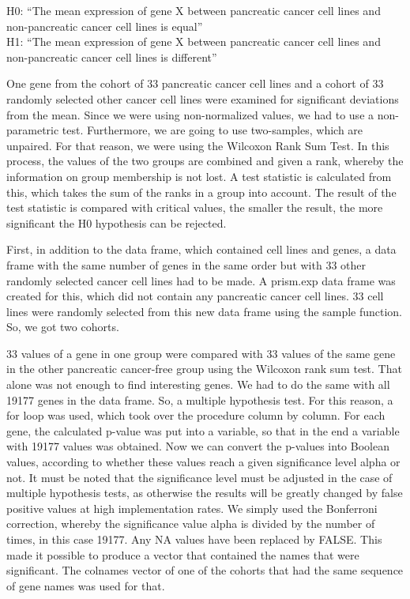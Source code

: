 \documentclass[
]{article}
\begin{document}
H0: ``The mean expression of gene X between pancreatic cancer cell lines
and non-pancreatic cancer cell lines is equal''\\
H1: ``The mean expression of gene X between pancreatic cancer cell lines
and non-pancreatic cancer cell lines is different''

One gene from the cohort of 33 pancreatic cancer cell lines and a cohort
of 33 randomly selected other cancer cell lines were examined for
significant deviations from the mean. Since we were using non-normalized
values, we had to use a non-parametric test. Furthermore, we are going
to use two-samples, which are unpaired. For that reason, we were using
the Wilcoxon Rank Sum Test. In this process, the values of the two
groups are combined and given a rank, whereby the information on group
membership is not lost. A test statistic is calculated from this, which
takes the sum of the ranks in a group into account. The result of the
test statistic is compared with critical values, the smaller the result,
the more significant the H0 hypothesis can be rejected.

First, in addition to the data frame, which contained cell lines and
genes, a data frame with the same number of genes in the same order but
with 33 other randomly selected cancer cell lines had to be made. A
prism.exp data frame was created for this, which did not contain any
pancreatic cancer cell lines. 33 cell lines were randomly selected from
this new data frame using the sample function. So, we got two cohorts.

33 values of a gene in one group were compared with 33 values of the
same gene in the other pancreatic cancer-free group using the Wilcoxon
rank sum test. That alone was not enough to find interesting genes. We
had to do the same with all 19177 genes in the data frame. So, a
multiple hypothesis test. For this reason, a for loop was used, which
took over the procedure column by column. For each gene, the calculated
p-value was put into a variable, so that in the end a variable with
19177 values was obtained. Now we can convert the p-values into Boolean
values, according to whether these values reach a given significance
level alpha or not. It must be noted that the significance level must be
adjusted in the case of multiple hypothesis tests, as otherwise the
results will be greatly changed by false positive values at high
implementation rates. We simply used the Bonferroni correction, whereby
the significance value alpha is divided by the number of times, in this
case 19177. Any NA values have been replaced by FALSE. This made it
possible to produce a vector that contained the names that were
significant. The colnames vector of one of the cohorts that had the same
sequence of gene names was used for that.
\end{document}
